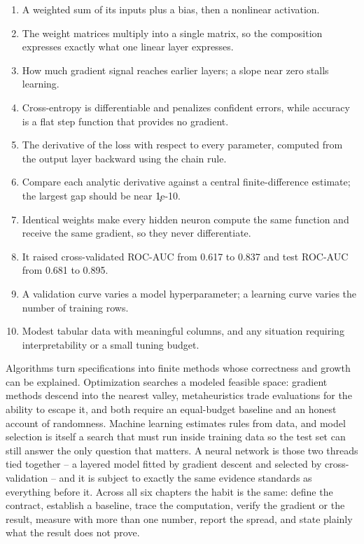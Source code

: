\begin{enumerate}
    \item A weighted sum of its inputs plus a bias, then a nonlinear activation.
    \item The weight matrices multiply into a single matrix, so the composition
          expresses exactly what one linear layer expresses.
    \item How much gradient signal reaches earlier layers; a slope near zero
          stalls learning.
    \item Cross-entropy is differentiable and penalizes confident errors, while
          accuracy is a flat step function that provides no gradient.
    \item The derivative of the loss with respect to every parameter, computed
          from the output layer backward using the chain rule.
    \item Compare each analytic derivative against a central finite-difference
          estimate; the largest gap should be near \c{1e-10}.
    \item Identical weights make every hidden neuron compute the same function
          and receive the same gradient, so they never differentiate.
    \item It raised cross-validated ROC-AUC from 0.617 to 0.837 and test ROC-AUC
          from 0.681 to 0.895.
    \item A validation curve varies a model hyperparameter; a learning curve
          varies the number of training rows.
    \item Modest tabular data with meaningful columns, and any situation
          requiring interpretability or a small tuning budget.
\end{enumerate}

\begin{tcolorbox}[title=Part VI summary,colframe=orange,colback=white,arc=2mm]
Algorithms turn specifications into finite methods whose correctness and growth
can be explained. Optimization searches a modeled feasible space: gradient
methods descend into the nearest valley, metaheuristics trade evaluations for
the ability to escape it, and both require an equal-budget baseline and an
honest account of randomness. Machine learning estimates rules from data, and
model selection is itself a search that must run inside training data so the
test set can still answer the only question that matters. A neural network is
those two threads tied together -- a layered model fitted by gradient descent and
selected by cross-validation -- and it is subject to exactly the same evidence
standards as everything before it. Across all six chapters the habit is the
same: define the contract, establish a baseline, trace the computation, verify
the gradient or the result, measure with more than one number, report the
spread, and state plainly what the result does not prove.
\end{tcolorbox}
